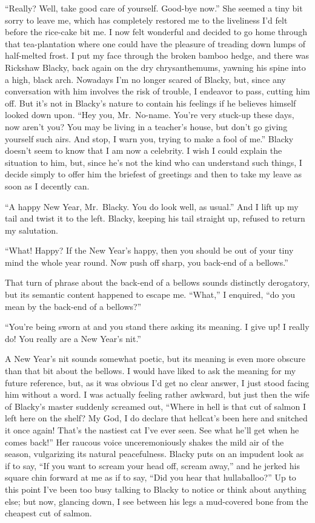 \documentclass{book}
\begin{document}
``Really? Well, take good care of yourself. Good-bye now.'' She seemed a
tiny bit sorry to leave me, which has completely restored me to the
liveliness I'd felt before the rice-cake bit me. I now felt wonderful
and decided to go home through that tea-plantation where one could have
the pleasure of treading down lumps of half-melted frost. I put my face
through the broken bamboo hedge, and there was Rickshaw Blacky, back
again on the dry chrysanthemums, yawning his spine into a high, black
arch. Nowadays I'm no longer scared of Blacky, but, since any
conversation with him involves the risk of trouble, I endeavor to pass,
cutting him off. But it's not in Blacky's nature to contain his feelings
if he believes himself looked down upon. ``Hey you, Mr.~No-name. You're
very stuck-up these days, now aren't you? You may be living in a
teacher's house, but don't go giving yourself such airs. And stop, I
warn you, trying to make a fool of me.'' Blacky doesn't seem to know
that I am now a celebrity. I wish I could explain the situation to him,
but, since he's not the kind who can understand such things, I decide
simply to offer him the briefest of greetings and then to take my leave
as soon as I decently can.

``A happy New Year, Mr.~Blacky. You do look well, as usual.'' And I lift
up my tail and twist it to the left. Blacky, keeping his tail straight
up, refused to return my salutation.

``What! Happy? If the New Year's happy, then you should be out of your
tiny mind the whole year round. Now push off sharp, you back-end of a
bellows.''

That turn of phrase about the back-end of a bellows sounds distinctly
derogatory, but its semantic content happened to escape me. ``What,'' I
enquired, ``do you mean by the back-end of a bellows?''

``You're being sworn at and you stand there asking its meaning. I give
up! I really do! You really are a New Year's nit.''

A New Year's nit sounds somewhat poetic, but its meaning is even more
obscure than that bit about the bellows. I would have liked to ask the
meaning for my future reference, but, as it was obvious I'd get no clear
answer, I just stood facing him without a word. I was actually feeling
rather awkward, but just then the wife of Blacky's master suddenly
screamed out, ``Where in hell is that cut of salmon I left here on the
shelf? My God, I do declare that hellcat's been here and snitched it
once again! That's the nastiest cat I've ever seen. See what he'll get
when he comes back!'' Her raucous voice unceremoniously shakes the mild
air of the season, vulgarizing its natural peacefulness. Blacky puts on
an impudent look as if to say, ``If you want to scream your head off,
scream away,'' and he jerked his square chin forward at me as if to say,
``Did you hear that hullaballoo?'' Up to this point I've been too busy
talking to Blacky to notice or think about anything else; but now,
glancing down, I see between his legs a mud-covered bone from the
cheapest cut of salmon.
\end{document}
